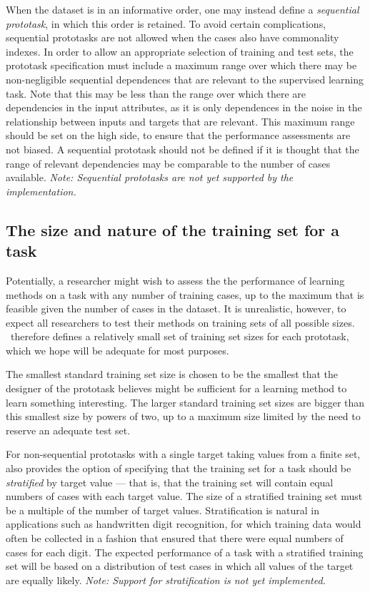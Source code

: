 When the dataset is in an informative order, one may instead define a
\emph{sequential prototask}, in which this order is retained.  To
avoid certain complications, sequential prototasks are not allowed
when the cases also have commonality indexes.  In order to allow an
appropriate selection of training and test sets, the prototask
specification must include a maximum range over which there may be
non-negligible sequential dependences that are relevant to the
supervised learning task.  Note that this may be less than the range
over which there are dependencies in the input attributes, as it is
only dependences in the noise in the relationship between inputs and
targets that are relevant.  This maximum range should be set on the
high side, to ensure that the performance assessments are not biased.
A sequential prototask should not be defined if it is thought that the
range of relevant dependencies may be comparable to the number of
cases available.  \emph{Note: Sequential prototasks are not yet
supported by the implementation.}

\subsection{The size and nature of the training set for a task}
\label{task-training-size}

Potentially, a researcher might wish to assess the the performance of
learning methods on a task with any number of training cases, up to
the maximum that is feasible given the number of cases in the dataset.
It is unrealistic, however, to expect all researchers to test their
methods on training sets of all possible sizes. \delve\ therefore
defines a relatively small set of training set sizes for each
prototask, which we hope will be adequate for most purposes.

The smallest standard training set size is chosen to be the smallest
that the designer of the prototask believes might be sufficient for a
learning method to learn something interesting.  The larger standard
training set sizes are bigger than this smallest size by powers of
two, up to a maximum size limited by the need to reserve an adequate
test set.

For non-sequential prototasks with a single target taking values from
a finite set, \delve{} also provides the option of specifying that the
training set for a task should be \emph{stratified} by target value
--- that is, that the training set will contain equal numbers of cases
with each target value.  The size of a stratified training set must be
a multiple of the number of target values.  Stratification is natural
in applications such as handwritten digit recognition, for which
training data would often be collected in a fashion that ensured that
there were equal numbers of cases for each digit.  The expected
performance of a task with a stratified training set will be based on
a distribution of test cases in which all values of the target are
equally likely. \emph{Note: Support for stratification is not yet
implemented.}


